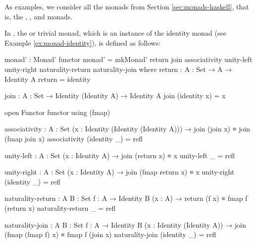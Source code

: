 As examples, we consider all the monads from Section
\ref{sec:monads-haskell}, that is, the ,
, and  monads.

\begin{example}
  \label{ex:monad-identity-agda}

  In \agda, the  or trivial monad, which is an
  instance of the identity monad (see Example
  \ref{ex:monad-identity}), is defined as follows:
  \begin{codeagda}
monad' : Monad' functor
monad' = mkMonad' return join associativity unity-left unity-right
                  naturality-return naturality-join
  where
    return : {A : Set} → A → Identity A
    return = identity

    join : {A : Set} → Identity (Identity A) → Identity A
    join (identity x) = x

    open Functor functor using (fmap)

    associativity : {A : Set}
                    (x : Identity (Identity (Identity A))) →
                    join (join x) ≡ join (fmap join x)
    associativity (identity _) = refl

    unity-left : {A : Set} (x : Identity A) → join (return x) ≡ x
    unity-left _ = refl

    unity-right : {A : Set} (x : Identity A) →
                  join (fmap return x) ≡ x
    unity-right (identity _) = refl

    naturality-return : {A B : Set} {f : A → Identity B} (x : A) →
                        return (f x) ≡ fmap f (return x)
    naturality-return _ = refl

    naturality-join : {A B : Set} {f : A → Identity B}
                      (x : Identity (Identity A)) →
                      join (fmap (fmap f) x) ≡ fmap f (join x)
    naturality-join (identity _) = refl
  \end{codeagda}

\end{example}


